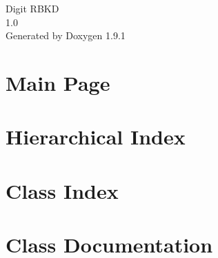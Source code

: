 \let\mypdfximage\pdfximage\def\pdfximage{\immediate\mypdfximage}\documentclass[twoside]{book}
\newcommand{\+}{\discretionary{\mbox{\scriptsize$\hookleftarrow$}}{}{}}
\newcommand{\clearemptydoublepage}{%
  \newpage{\pagestyle{empty}\cleardoublepage}%
}
\begin{document}
\raggedbottom

\hypersetup{pageanchor=false,
             bookmarksnumbered=true,
             pdfencoding=unicode
            }
\begin{titlepage}
\vspace*{7cm}
\begin{center}%
{\Large Digit RBKD \\[1ex]\large 1.\+0 }\\
\vspace*{1cm}
{\large Generated by Doxygen 1.9.1}\\
\end{center}
\end{titlepage}
\clearemptydoublepage
{}
\tableofcontents
\clearemptydoublepage
{}
\hypersetup{pageanchor=true}

\chapter{Main Page}
\label{index}\hypertarget{index}{}
\chapter{Hierarchical Index}

\chapter{Class Index}

\chapter{Class Documentation}


















\backmatter
\newpage
{}
\clearemptydoublepage
{}
\printindex
\end{document}
